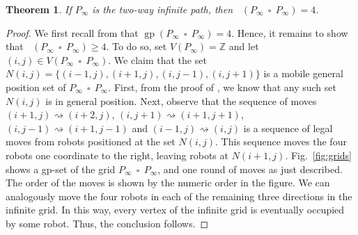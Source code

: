 \documentclass[a4paper,12pt]{article}
\DeclareMathOperator{\mob}{Mob_{gp}}
\DeclareMathOperator{\gp}{gp}
\DeclareMathOperator{\cp}{\,\square\,}
\newtheorem{theorem}{Theorem}[section]
\theoremstyle{definition}
\newcommand{\move}{\rightsquigarrow}
\begin{document}
	\begin{theorem}\label{thm:infinitegrid}
		If $P_\infty$ is the two-way infinite path, then $\mob(P_\infty\cp P_\infty) = 4$.
	\end{theorem}
	
	\begin{proof}
		We first recall from \cite[Corollary 3.2]{Manuel-2018b} that $\gp(P_\infty\cp P_\infty) = 4$. Hence, it remains to show that $\mob(P_\infty\cp P_\infty) \ge 4$. To do so, set $V(P_\infty)=\mathbb{Z}$ and let $(i,j)\in V(P_\infty\cp P_\infty)$. We claim that the set $N(i,j) =  \{(i-1,j),(i+1,j),(i,j-1),(i,j+1)\}$ is a mobile general position set of $P_\infty\cp P_\infty$. First, from the proof of \cite[Corollary 3.2]{Manuel-2018b}, we know that any such set $N(i,j)$ is in general position. Next, observe that the sequence of moves $(i+1,j)\move (i+2,j)$, $(i,j+1)\move (i+1,j+1)$, $(i,j-1)\move (i+1,j-1)$ and $(i-1,j)\move (i,j)$ is a sequence of legal moves from robots positioned at the set $N(i,j)$. This sequence moves the four robots one coordinate to the right, leaving robots at $N(i+1,j)$. Fig.~\ref{fig:grids} shows a gp-set of the grid $P_\infty\cp P_\infty$, and one round of moves as just described. The order of the moves is shown by the numeric order in the figure. We can analogously move the four robots in each of the remaining three directions in the infinite grid. In this way, every vertex of the infinite grid is eventually occupied by some robot. Thus, the conclusion follows.
	\end{proof}
	
\end{document}
